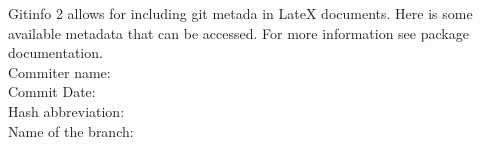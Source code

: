 \documentclass{article}
\begin{document}
\noindent Gitinfo 2 allows for including git metada in LateX documents. Here is some available metadata that can be accessed. For more information see package documentation. \\
Commiter name: \gitCommitterName \\
Commit Date: \gitCommitterIsoDate \\
Hash abbreviation: \gitAbbrevHash \\
Name of the branch: \gitBranch \\
\end{document}
